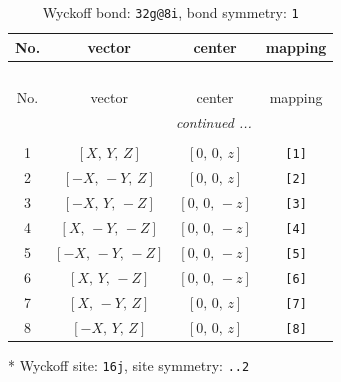 \documentclass[fleqn,8pt]{jsarticle}
\begin{document}
\begin{longtable}{cccc}
\caption{Wyckoff bond: {\tt 32g@8i}, bond symmetry: {\tt 1}}
 \\
 \hline \hline
No. & vector & center & mapping \\ \hline \endfirsthead

\multicolumn{3}{l}{\tablename\ \thetable{}} \\
 \hline \hline
No. & vector & center & mapping \\ \hline \endhead

 \hline \hline
\multicolumn{3}{r}{\footnotesize\it continued ...} \\ \endfoot

 \hline \hline
\multicolumn{3}{r}{} \\ \endlastfoot

1 & $\left[ X,\, Y,\, Z \right]$ & $\left[ 0,\, 0,\, z \right]$ & {\tt [1]} \\ \hline
2 & $\left[ - X,\, - Y,\, Z \right]$ & $\left[ 0,\, 0,\, z \right]$ & {\tt [2]} \\ \hline
3 & $\left[ - X,\, Y,\, - Z \right]$ & $\left[ 0,\, 0,\, - z \right]$ & {\tt [3]} \\ \hline
4 & $\left[ X,\, - Y,\, - Z \right]$ & $\left[ 0,\, 0,\, - z \right]$ & {\tt [4]} \\ \hline
5 & $\left[ - X,\, - Y,\, - Z \right]$ & $\left[ 0,\, 0,\, - z \right]$ & {\tt [5]} \\ \hline
6 & $\left[ X,\, Y,\, - Z \right]$ & $\left[ 0,\, 0,\, - z \right]$ & {\tt [6]} \\ \hline
7 & $\left[ X,\, - Y,\, Z \right]$ & $\left[ 0,\, 0,\, z \right]$ & {\tt [7]} \\ \hline
8 & $\left[ - X,\, Y,\, Z \right]$ & $\left[ 0,\, 0,\, z \right]$ & {\tt [8]} \\
\end{longtable}
* Wyckoff site: {\tt 16j}, site symmetry: {\tt ..2}
\renewcommand{\arraystretch}{1.2}
\end{document}

